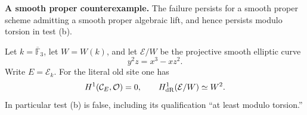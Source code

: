 \par\smallskip\noindent\textbf{A smooth proper counterexample.}
The failure persists for a smooth proper scheme admitting a smooth proper algebraic lift, and hence persists modulo torsion in test (b).

\begin{proposition}\label{prop:DE-old-proper}
Let $k=\overline{\mathbb F}_3$, let $W=W(k)$, and let $\mathcal E/W$ be the projective smooth elliptic curve
\[
                         y^2z=x^3-xz^2.
\]
Write $E=\mathcal E_k$.  For the literal old site one has
\[
 H^1(\mathcal C_E,\mathcal O)=0,
 \qquad H^1_{\mathrm{dR}}(\mathcal E/W)\simeq W^2.
\]
In particular test (b) is false, including its qualification ``at least modulo torsion.''
\end{proposition}
